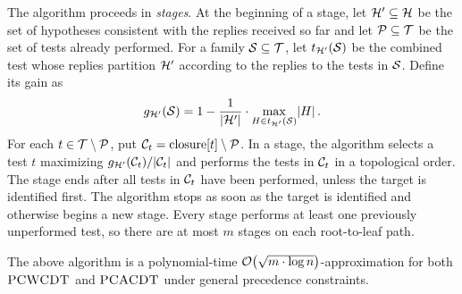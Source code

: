 The algorithm proceeds in \emph{stages}. At the beginning of a stage, let $\mathcal{H}'\subseteq\mathcal{H}$ be the set of hypotheses consistent with the replies received so far and let $\mathcal{P}\subseteq\mathcal{T}$ be the set of tests already performed. For a family $\mathcal{S}\subseteq\mathcal{T}$, let $t_{\mathcal{H}'}\mathopen{}\left( \mathcal{S} \right)$ be the combined test whose replies partition $\mathcal{H}'$ according to the replies to the tests in $\mathcal{S}$. Define its gain as
\[
    g_{\mathcal{H}'}(\mathcal{S})=1-\frac{1}{\mathopen{}\left| \mathcal{H}' \right|}\cdot\max_{H\in t_{\mathcal{H}'}\mathopen{}\left( \mathcal{S} \right)}\mathopen{}\left| H \right|.
\]
For each $t\in\mathcal{T}\setminus \mathcal{P}$, put $\mathcal{C}_t=\operatorname{closure}[t]\setminus \mathcal{P}$. In a stage, the algorithm selects a test $t$ maximizing $g_{\mathcal{H}'}(\mathcal{C}_t)/\mathopen{}\left| \mathcal{C}_t \right|$ and performs the tests in $\mathcal{C}_t$ in a topological order. The stage ends after all tests in $\mathcal{C}_t$ have been performed, unless the target is identified first. The algorithm stops as soon as the target is identified and otherwise begins a new stage. Every stage performs at least one previously unperformed test, so there are at most $m$ stages on each root-to-leaf path.

\begin{theorem}\label{thm:greedy-general}
The above algorithm is a polynomial-time $\mathcal{O}\mathopen{}\left( \sqrt{m\cdot\log n} \right)$-approximation for both $\textup{\textsc{PCWCDT}}$ and $\textup{\textsc{PCACDT}}$ under general precedence constraints.
\end{theorem}


